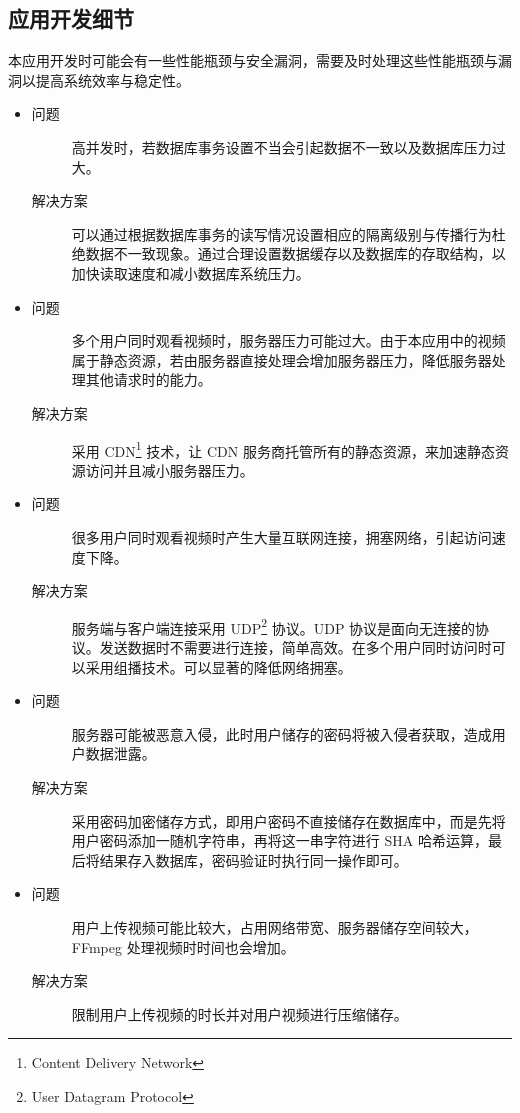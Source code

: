 \documentclass[a4paper, 12pt, UTF8]{ctexart}
\begin{document}
	\subsection{应用开发细节}
	本应用开发时可能会有一些性能瓶颈与安全漏洞，需要及时处理这些性能瓶颈与漏洞以提高系统效率与稳定性。
	\begin{itemize}
  \item {
  \begin{description}
  	\item[问题] 高并发时，若数据库事务设置不当会引起数据不一致以及数据库压力过大。
  	\item[解决方案] 可以通过根据数据库事务的读写情况设置相应的隔离级别与传播行为杜绝数据不一致现象\cite{DB2014}。通过合理设置数据缓存以及数据库的存取结构，以加快读取速度和减小数据库系统压力。
  \end{description}}
  \item {\begin{description}
  	\item[问题] 多个用户同时观看视频时，服务器压力可能过大。由于本应用中的视频属于静态资源，若由服务器直接处理会增加服务器压力，降低服务器处理其他请求时的能力。
  	\item[解决方案] 采用 CDN\footnote{Content Delivery Network} 技术，让 CDN 服务商托管所有的静态资源，来加速静态资源访问并且减小服务器压力。
  \end{description}}
  \item {\begin{description}
  	\item[问题] 很多用户同时观看视频时产生大量互联网连接，拥塞网络，引起访问速度下降。
  	\item[解决方案] 服务端与客户端连接采用 UDP\footnote{User Datagram Protocol} 协议。UDP 协议是面向无连接的协议。发送数据时不需要进行连接，简单高效。在多个用户同时访问时可以采用组播技术。可以显著的降低网络拥塞\cite{竹下隆史2013}。
  \end{description}}
  \item \begin{description}
  	\item[问题] 服务器可能被恶意入侵，此时用户储存的密码将被入侵者获取，造成用户数据泄露。
  	\item[解决方案] 采用密码加密储存方式，即用户密码不直接储存在数据库中，而是先将用户密码添加一随机字符串，再将这一串字符进行 SHA 哈希运算，最后将结果存入数据库，密码验证时执行同一操作即可。
  \end{description}
  \item \begin{description}
  	\item[问题] 用户上传视频可能比较大，占用网络带宽、服务器储存空间较大，FFmpeg 处理视频时时间也会增加。
  	\item[解决方案] 限制用户上传视频的时长并对用户视频进行压缩储存。
  \end{description}
\end{itemize}
\end{document}
